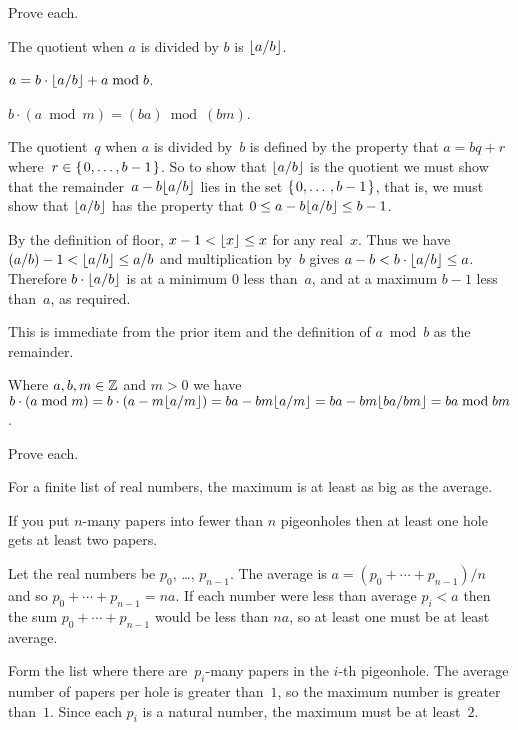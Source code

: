 \documentclass{ibl}  %
\begin{document}
\begin{ex} Prove each.
\begin{exes} 
\item The quotient when $a$ is divided by $b$ is $\lfloor a/b \rfloor$.
\item $a =b\cdot\lfloor a/b \rfloor+a\bmod b$.    
\item $b\cdot(a\bmod m)=(ba)\bmod{(bm)}$.    
\end{exes}
\begin{ans}
\begin{exes}
\item The quotient~$q$ when $a$ is divided by~$b$ is defined by the
  property that $a=bq+r$ where~$r\in\mbox{$\{\hspace{0.1em}0,\ldots,b-1\hspace{0.1em}\}$}$.
  So to show that $\lfloor a/b \rfloor$ is the quotient we must show that 
  the remainder~$a-b\lfloor a/b \rfloor$
  lies in the set $\mbox{$\{\hspace{0.1em}0,\ldots\,,b-1\hspace{0.1em}\}$}$, that is, 
  we must show that $\lfloor a/b \rfloor$ has the property 
  that $0\leq a-b\lfloor a/b \rfloor\leq b-1$.
  
  By the definition of floor, $x-1<\lfloor x \rfloor\leq x$ for any real~$x$. 
  Thus we have
  $(a/b)-1< \lfloor a/b \rfloor\leq a/b$ and multiplication by~$b$ gives
  $a-b< b\cdot\lfloor a/b \rfloor\leq a$.
  Therefore $b\cdot\lfloor a/b \rfloor$ is at a minimum $0$ less than~$a$, and
  at a maximum $b-1$ less than~$a$, as required.
\item This is immediate from the prior item and the 
  definition of $a\bmod b$ as the remainder.
\item Where $a, b, m\in\mathbb{Z}$ and $m>0$ we have
  $b\cdot(a\bmod m)=b\cdot(a-m\lfloor a/m \rfloor)
  =ba- bm\lfloor a/m \rfloor
  =ba- bm\lfloor ba/bm \rfloor
  =ba\bmod bm$.    
\end{exes}
\end{ans}
\end{ex}

\begin{ex}  Prove each.
\begin{exes}
\item For a finite list of real numbers,
  the maximum is at least as big as the average.
\item If you put $n$-many papers into fewer than $n$
  pigeonholes then at least one hole gets at least two papers.    
\end{exes}
\begin{ans}
\begin{exes}
\item Let the real numbers be $p_0$, \ldots, $p_{n-1}$.
  The average is $a=(p_0+\cdots+p_{n-1})/n$ and so 
  $p_0+\cdots+p_{n-1}=na$.
  If each number were less than average $p_i<a$ then the sum
  $p_0+\cdots+p_{n-1}$ would be less than $na$, so at least
  one must be at least average.
\item Form the list where there are~$p_i$-many papers in the $i$-th pigeonhole.
  The average number of papers per hole is greater than~$1$, 
  so the maximum number is greater than~$1$.
  Since each $p_i$ is a natural number, the maximum must be at least~$2$.      
\end{exes}
\end{ans}
\end{ex}
\end{document}
